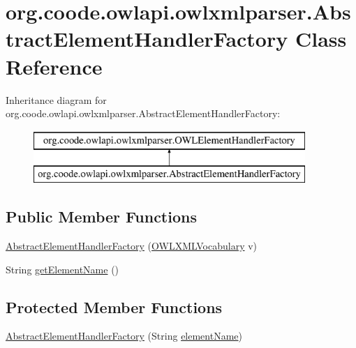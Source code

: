 \hypertarget{classorg_1_1coode_1_1owlapi_1_1owlxmlparser_1_1_abstract_element_handler_factory}{\section{org.\-coode.\-owlapi.\-owlxmlparser.\-Abstract\-Element\-Handler\-Factory Class Reference}
\label{classorg_1_1coode_1_1owlapi_1_1owlxmlparser_1_1_abstract_element_handler_factory}
}
Inheritance diagram for org.\-coode.\-owlapi.\-owlxmlparser.\-Abstract\-Element\-Handler\-Factory\-:\begin{figure}[H]
\begin{center}
\leavevmode
\includegraphics[height=2.000000cm]{classorg_1_1coode_1_1owlapi_1_1owlxmlparser_1_1_abstract_element_handler_factory}
\end{center}
\end{figure}
\subsection*{Public Member Functions}
\begin{DoxyCompactItemize}
\item 
\hyperlink{classorg_1_1coode_1_1owlapi_1_1owlxmlparser_1_1_abstract_element_handler_factory_a90f222bd15beea71c4644701ca4d8253}{Abstract\-Element\-Handler\-Factory} (\hyperlink{enumorg_1_1semanticweb_1_1owlapi_1_1vocab_1_1_o_w_l_x_m_l_vocabulary}{O\-W\-L\-X\-M\-L\-Vocabulary} v)
\item 
String \hyperlink{classorg_1_1coode_1_1owlapi_1_1owlxmlparser_1_1_abstract_element_handler_factory_a319dbe30d9d4d8776653aa96556aa086}{get\-Element\-Name} ()
\end{DoxyCompactItemize}
\subsection*{Protected Member Functions}
\begin{DoxyCompactItemize}
\item 
\hyperlink{classorg_1_1coode_1_1owlapi_1_1owlxmlparser_1_1_abstract_element_handler_factory_a2afc88bc3efc89bd50e1393dab5c819b}{Abstract\-Element\-Handler\-Factory} (String \hyperlink{classorg_1_1coode_1_1owlapi_1_1owlxmlparser_1_1_abstract_element_handler_factory_ab8c7a850a90b934dcfc64e5a3f1affdc}{element\-Name})
\end{DoxyCompactItemize}
